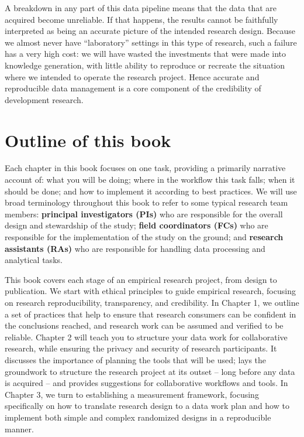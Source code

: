 A breakdown in any part of this data pipeline
means that the data that are acquired become unreliable.
If that happens, the results cannot be faithfully interpreted
as being an accurate picture of the intended research design.
Because we almost never have ``laboratory'' settings in this type of research,
such a failure has a very high cost:
we will have wasted the investments that were made into knowledge generation,
with little ability to reproduce or recreate the situation
where we intended to operate the research project.
Hence accurate and reproducible data management is a core component
of the credibility of development research.

\section{Outline of this book}

Each chapter in this book focuses on one task, providing a primarily narrative account of:
what you will be doing; where in the workflow this task falls;
when it should be done; and how to implement it according to best practices.
We will use broad terminology throughout this book to refer to some typical research team members:
\textbf{principal investigators (PIs)} who are responsible for
the overall design and stewardship of the study;
\textbf{field coordinators (FCs)} who are responsible for
the implementation of the study on the ground;
and \textbf{research assistants (RAs)} who are responsible for
handling data processing and analytical tasks.

This book covers each stage of an empirical research project, from design to publication.
We start with ethical principles to guide empirical research,
focusing on research reproducibility, transparency, and credibility.
In Chapter 1, we outline a set of practices that help to ensure that
research consumers can be confident in the conclusions reached,
and research work can be assumed and verified to be reliable.
Chapter 2 will teach you to structure your data work for collaborative research,
while ensuring the privacy and security of research participants.
It discusses the importance of planning the tools that will be used;
lays the groundwork to structure the research project at its outset --
long before any data is acquired --
and provides suggestions for collaborative workflows and tools.
In Chapter 3, we turn to establishing a measurement framework,
focusing specifically on how to translate research design to a data work plan
and how to implement both simple and complex randomized designs in a reproducible manner.


